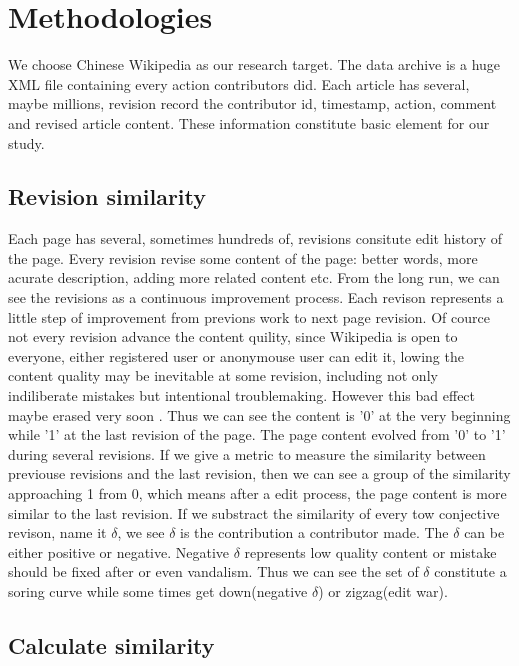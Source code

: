 \documentclass{elsarticle}
\begin{document}
 \section{Methodologies}
 \label{sec:methodoligis}

 We choose Chinese Wikipedia as our research target. The data archive
 is  a huge XML file containing every action contributors did. Each
 article has several, maybe millions, revision record the contributor
 id, timestamp, action, comment and revised article content. These
 information constitute basic element for our study.

\subsection{Revision similarity}
\label{sec:revision-similarity}

Each page has several, sometimes hundreds of, revisions consitute edit
history of the page. Every revision revise some content of the page:
better words, more acurate description, adding more related content
etc. From the long run, we can see the revisions as a continuous
improvement process. Each revison represents a little step of
improvement from previons work to next page revision. Of cource not
every revision advance the content quility, since Wikipedia is open to
everyone, either registered user or anonymouse user can edit it,
lowing the content quality may be inevitable at some revision,
including not
only  indiliberate mistakes but intentional troublemaking. However
this bad effect maybe erased very soon . Thus
we can see the content is '0' at the very beginning while '1' at the
last revision of the page. The page content evolved from '0' to '1'
during several revisions. If we give a metric to measure the
similarity between  previouse revisions and the last revision, then
we can see a group of the similarity   approaching 1 from 0, which
means after a edit process, the page content is more similar to the
last revision.  If we substract the similarity of every tow conjective
revison, name it $\delta$, we see $\delta$ is the contribution a
contributor made. The $\delta$ can be either positive or
negative. Negative $\delta$ represents low quality content or mistake
should be fixed after or even vandalism. Thus we can see the set of
$\delta$ constitute a soring curve while some times get down(negative
$\delta$) or zigzag(edit war).

\subsection{Calculate similarity}
\label{sec:calculate-similarity}
\end{document}
